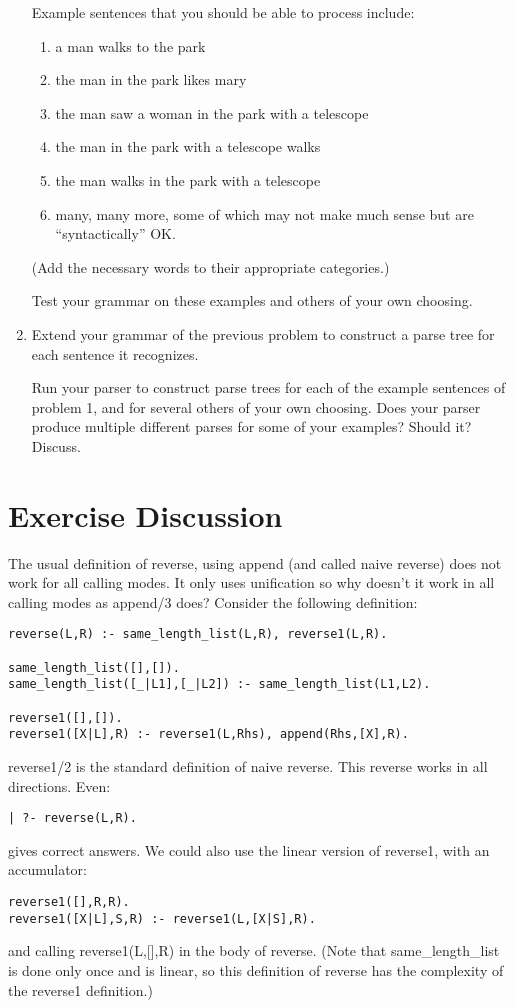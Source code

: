 \begin{enumerate}
Example sentences that you should be able to process include:

\begin{enumerate}
\item
a man walks to the park
\item
the man in the park likes mary
\item
the man saw a woman in the park with a telescope
\item 
the man in the park with a telescope walks
\item 
the man walks in the park with a telescope 
\item 
many, many more, some of which may not make much sense but are ``syntactically'' OK.
\end{enumerate}
(Add the necessary words to their appropriate categories.)

Test your grammar on these examples and others of your own choosing.

\item
Extend your grammar of the previous problem to construct a parse tree for each
sentence it recognizes.

Run your parser to construct parse trees for each of the example
sentences of problem 1, and for several others of your own choosing.
Does your parser produce multiple different parses for some of your
examples?  Should it?  Discuss.

\end{enumerate}

\section{Exercise Discussion}

The usual definition of reverse, using append (and called naive
reverse) does not work for all calling modes.  It only uses
unification so why doesn't it work in all calling modes as append/3
does?  Consider the following definition:
\begin{verbatim}
reverse(L,R) :- same_length_list(L,R), reverse1(L,R).

same_length_list([],[]).
same_length_list([_|L1],[_|L2]) :- same_length_list(L1,L2).

reverse1([],[]).
reverse1([X|L],R) :- reverse1(L,Rhs), append(Rhs,[X],R).
\end{verbatim}
reverse1/2 is the standard definition of naive reverse.  This reverse
works in all directions.  Even:
\begin{verbatim}
| ?- reverse(L,R).
\end{verbatim}
gives correct answers.
We could also use the linear version of reverse1, with an accumulator:
\begin{verbatim}
reverse1([],R,R).
reverse1([X|L],S,R) :- reverse1(L,[X|S],R).
\end{verbatim}
and calling reverse1(L,[],R) in the body of reverse.
(Note that same\_length\_list is done only once and is linear, so this
definition of reverse has the complexity of the reverse1 definition.)

